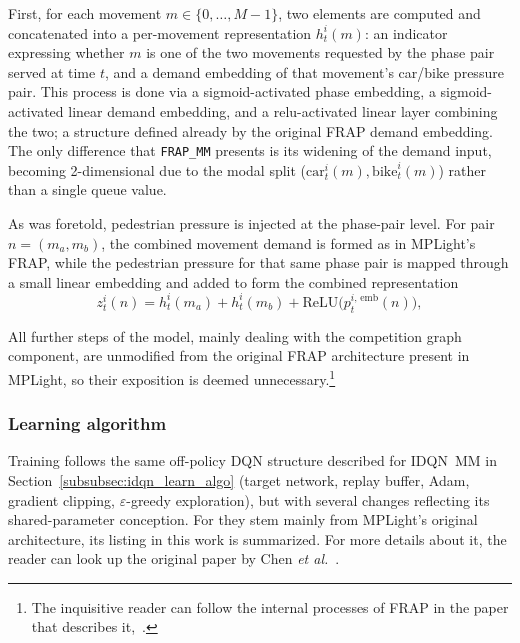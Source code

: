 \medskip

\noindent First, for each movement $m \in \{0,\dots,M-1\}$, two elements are computed and concatenated into a per-movement representation $h_t^i(m)$: an indicator expressing whether $m$ is one of the two movements requested by the phase pair served at time $t$, and a demand embedding of that movement's car/bike pressure pair. This process is done via a sigmoid-activated phase embedding, a sigmoid-activated linear demand embedding, and a \gls{relu}-activated linear layer combining the two; a structure defined already by the original FRAP demand embedding. The only difference that \texttt{FRAP\_MM} presents is its widening of the demand input, becoming 2-dimensional due to the modal split ($\mathrm{car}_t^i(m), \mathrm{bike}_t^i(m)$) rather than a single queue value.
 
\medskip

\noindent As was foretold, pedestrian pressure is injected at the phase-pair level. For pair $n = (m_a, m_b)$, the combined movement demand is formed as in MPLight's FRAP, while the pedestrian pressure for that same phase pair is mapped through a small linear embedding and added to form the combined representation
\begin{equation}
z_t^i(n) = h_t^i(m_a) + h_t^i(m_b) + \mathrm{ReLU}\big(p_t^{i\text{, emb}}(n)\big),
\end{equation}

\noindent All further steps of the model, mainly dealing with the competition graph component, are unmodified from the original FRAP architecture present in MPLight, so their exposition is deemed unnecessary.\footnote{The inquisitive reader can follow the internal processes of FRAP in the paper that describes it,~\cite{Zheng2019}.}
 
\subsubsection{Learning algorithm}
\label{subsubsec:mplight-learning}
 
Training follows the same off-policy DQN structure described for IDQN~MM in Section~\ref{subsubsec:idqn_learn_algo} (target network, replay buffer, Adam, gradient clipping, $\varepsilon$-greedy exploration), but with several changes reflecting its shared-parameter conception. For they stem mainly from MPLight's original architecture, its listing in this work is summarized. For more details about it, the reader can look up the original paper by Chen \textit{et al.}~\cite{Chen2020}.


